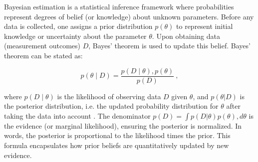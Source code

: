Bayesian estimation is a statistical inference framework where
probabilities represent degrees of belief (or knowledge) about unknown
parameters. Before any data is collected, one assigns a prior
distribution $p(\theta)$ to represent initial knowledge or uncertainty
about the parameter $\theta$. Upon obtaining data (measurement
outcomes) $D$, Bayes’ theorem is used to update this belief. Bayes’
theorem can be stated as:

\begin{equation}

p(\theta \mid D) = \frac{p(D \mid \theta), p(\theta)}{p(D)}~,

\label{eq:Bayes}

\end{equation}

where $p(D \mid \theta)$ is the likelihood of observing data $D$ given
$\theta$, and $p(\theta|D)$ is the posterior distribution, i.e. the
updated probability distribution for $\theta$ after taking the data
into account . The denominator $p(D) = \int
p(D|\theta)p(\theta),d\theta$ is the evidence (or marginal
likelihood), ensuring the posterior is normalized. In words, the
posterior is proportional to the likelihood times the prior. This
formula encapsulates how prior beliefs are quantitatively updated by
new evidence.



